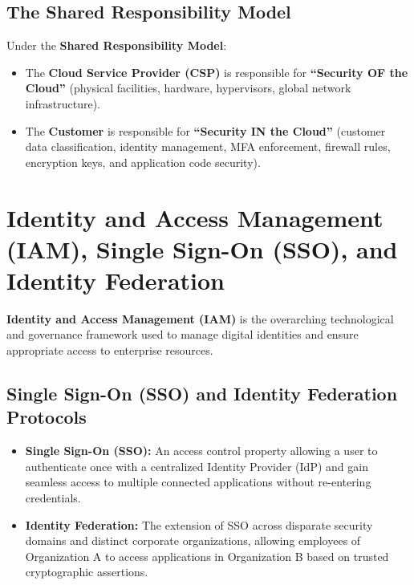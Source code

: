 \subsection{The Shared Responsibility Model}

Under the \textbf{Shared Responsibility Model}:
\begin{itemize}
\item The \textbf{Cloud Service Provider (CSP)} is responsible for \textbf{``Security OF the Cloud''} (physical facilities, hardware, hypervisors, global network infrastructure).
\item The \textbf{Customer} is responsible for \textbf{``Security IN the Cloud''} (customer data classification, identity management, MFA enforcement, firewall rules, encryption keys, and application code security).
\end{itemize}

\newpage
\section{Identity and Access Management (IAM), Single Sign-On (SSO), and Identity Federation}

\textbf{Identity and Access Management (IAM)} is the overarching technological and governance framework used to manage digital identities and ensure appropriate access to enterprise resources.

\subsection{Single Sign-On (SSO) and Identity Federation Protocols}

\begin{itemize}
\item \textbf{Single Sign-On (SSO):} An access control property allowing a user to authenticate once with a centralized Identity Provider (IdP) and gain seamless access to multiple connected applications without re-entering credentials.
\item \textbf{Identity Federation:} The extension of SSO across disparate security domains and distinct corporate organizations, allowing employees of Organization A to access applications in Organization B based on trusted cryptographic assertions.
\end{itemize}

